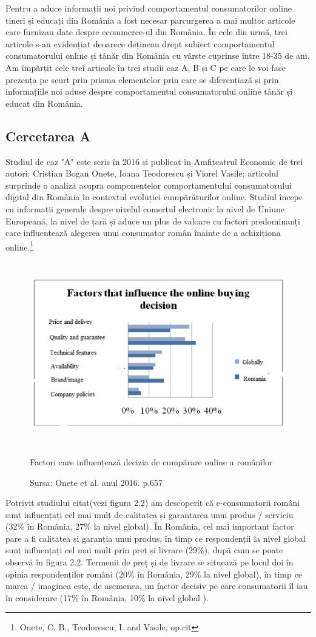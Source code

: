 \documentclass[a4paper, 12pt]{article}
\begin{document}
 \qquad Pentru a aduce informații noi privind comportamentul consumatorilor online tineri și educați din România a fost necesar parcurgerea a mai multor articole care furnizau date despre ecommerce-ul din România. În cele din urmă, trei articole s-au evidențiat deoarece dețineau drept subiect comportamentul consumatorului online și tânăr din România cu vârste cuprinse între 18-35 de ani. Am împărțit cele trei articole în trei studii caz A, B și C pe care le voi face prezența pe scurt prin prisma elementelor prin care se diferențiază și prin informațiile noi aduse despre comportamentul consumatorului online tânăr și educat din România.
 \subsection{Cercetarea A}
 	\qquad\space Studiul de caz "A" este scris în 2016 și publicat în Amfiteatrul Economic  de trei autori: Cristian Bogan Onete, Ioana Teodorescu și Viorel Vasile; articolul surprinde o analiză asupra componentelor comportamentului consumatorului digital din România în contextul evoluției cumpărăturilor online. Studiul începe cu informații generale despre nivelul comerțul electronic la nivel de Uniune Europeană, la nivel de țară și aduce un plus de valoare cu  factori predominanți care influențează alegerea unui consumator român înainte de a achiziționa online.\footnote{Onete, C. B., Teodorescu, I. and Vasile, op.cit}
 	\begin{figure}[!htb]
 	\centering
 	\includegraphics[width=12cm, height=8cm]{"figures/fifth.png"}
 	\caption{Factori care influențează decizia de cumpărare online a românilor}\label{fig:fifth}
 	\caption*{Sursa: Onete et al. anul 2016. p.657}
 \end{figure}

		\quad  Potrivit studiului citat(vezi figura 2.2) am descoperit că e-consumatorii  români sunt influențați cel mai mult de calitatea și garantarea unui produs / serviciu (32\% în România, 27\% la nivel global). În România, cel mai important factor pare a fi calitatea și garanția unui produs, în timp ce respondenții la nivel global sunt influențați cel mai mult prin preț și livrare (29\%), după cum se poate observă în figura 2.2. Termenii de preț și de livrare se situează pe locul doi în opinia respondenților români (20\% în România, 29\% la nivel global), în timp ce marca / imaginea este, de asemenea, un factor decisiv pe care consumatorii îl iau în considerare (17\% în România, 10\% la nivel global ).
		
\end{document}
